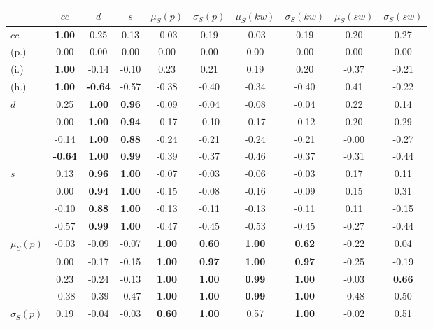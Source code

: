 \begin{table*}[h!]
\begin{center}
\begin{tabular}{| l || c | c | c | c | c | c | c | c | c |}\hline
 & $cc$ & $d$ & $s$ & $\mu_S(p)$ & $\sigma_S(p)$ & $\mu_S(kw)$ & $\sigma_S(kw)$ & $\mu_S(sw)$ & $\sigma_S(sw)$ \\\hline\hline
$cc$ & {\bf 1.00} & 0.25 & 0.13 & -0.03 & 0.19 & -0.03 & 0.19 & 0.20 & 0.27 \\
(p.) & 0.00  & 0.00  & 0.00  & 0.00  & 0.00  & 0.00  & 0.00  & 0.00  & 0.00 \\
(i.) & {\bf 1.00} & -0.14 & -0.10 & 0.23 & 0.21 & 0.19 & 0.20 & -0.37 & -0.21 \\
(h.) & {\bf 1.00} & {\bf -0.64} & -0.57 & -0.38 & -0.40 & -0.34 & -0.40 & 0.41 & -0.22 \\\hline
$d$ & 0.25 & {\bf 1.00} & {\bf 0.96} & -0.09 & -0.04 & -0.08 & -0.04 & 0.22 & 0.14 \\
 & 0.00 & {\bf 1.00} & {\bf 0.94} & -0.17 & -0.10 & -0.17 & -0.12 & 0.20 & 0.29 \\
 & -0.14 & {\bf 1.00} & {\bf 0.88} & -0.24 & -0.21 & -0.24 & -0.21 & -0.00 & -0.27 \\
 & {\bf -0.64} & {\bf 1.00} & {\bf 0.99} & -0.39 & -0.37 & -0.46 & -0.37 & -0.31 & -0.44 \\\hline
$s$ & 0.13 & {\bf 0.96} & {\bf 1.00} & -0.07 & -0.03 & -0.06 & -0.03 & 0.17 & 0.11 \\
 & 0.00 & {\bf 0.94} & {\bf 1.00} & -0.15 & -0.08 & -0.16 & -0.09 & 0.15 & 0.31 \\
 & -0.10 & {\bf 0.88} & {\bf 1.00} & -0.13 & -0.11 & -0.13 & -0.11 & 0.11 & -0.15 \\
 & -0.57 & {\bf 0.99} & {\bf 1.00} & -0.47 & -0.45 & -0.53 & -0.45 & -0.27 & -0.44 \\\hline
$\mu_S(p)$ & -0.03 & -0.09 & -0.07 & {\bf 1.00} & {\bf 0.60} & {\bf 1.00} & {\bf 0.62} & -0.22 & 0.04 \\
 & 0.00 & -0.17 & -0.15 & {\bf 1.00} & {\bf 0.97} & {\bf 1.00} & {\bf 0.97} & -0.25 & -0.19 \\
 & 0.23 & -0.24 & -0.13 & {\bf 1.00} & {\bf 1.00} & {\bf 0.99} & {\bf 1.00} & -0.03 & {\bf 0.66} \\
 & -0.38 & -0.39 & -0.47 & {\bf 1.00} & {\bf 1.00} & {\bf 0.99} & {\bf 1.00} & -0.48 & 0.50 \\\hline
$\sigma_S(p)$ & 0.19 & -0.04 & -0.03 & {\bf 0.60} & {\bf 1.00} & 0.57 & {\bf 1.00} & -0.02 & 0.51 \\

\end{tabular}
\end{center}
\end{table*}
